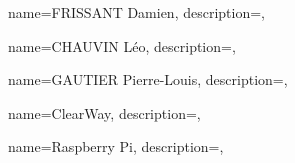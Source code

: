 {
    name={FRISSANT Damien},
    description={},
}

{
    name={CHAUVIN Léo},
    description={},
}

{
    name={GAUTIER Pierre-Louis},
    description={},
}

{
    name={ClearWay},
    description={},
}

{
    name={Raspberry Pi},
    description={},
}